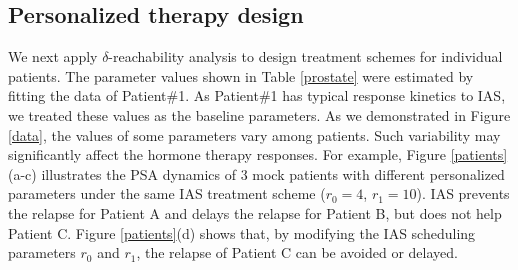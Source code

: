\subsection{Personalized therapy design}
We next apply $\delta$-reachability analysis to design treatment schemes for individual patients. The parameter values shown in Table \ref{prostate} were estimated by fitting the data of Patient\#1. As Patient\#1 has typical response kinetics to IAS, we treated these values as the baseline parameters. As we demonstrated in Figure \ref{data}, the values of some parameters vary among patients. Such variability may significantly affect the hormone therapy responses. 
%
%
%
For example, Figure \ref{patients}(a-c) illustrates the PSA dynamics of $3$ mock patients with different personalized parameters under the same IAS treatment scheme ($r_0=4$, $r_1=10$). IAS prevents the relapse for Patient A and delays the relapse for Patient B, but does not help Patient C. Figure \ref{patients}(d) shows that, by modifying the IAS scheduling parameters $r_0$ and $r_1$, the relapse of Patient C can be avoided or delayed. 

